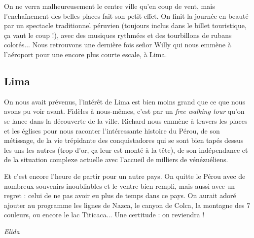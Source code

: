 On ne verra malheureusement le centre ville qu'en coup de vent, mais
l'enchaînement des belles places fait son petit effet. On finit la
journée en beauté par un spectacle traditionnel péruvien (toujours
inclus dans le billet touristique, ça vaut le coup !), avec des musiques
rythmées et des tourbillons de rubans colorés... Nous retrouvons une
dernière fois señor Willy qui nous emmène à l'aéroport pour une encore
plus courte escale, à Lima.

\hypertarget{lima}{%
\subsection{Lima}\label{lima}}

On nous avait prévenus, l'intérêt de Lima est bien moins grand que ce
que nous avons pu voir avant. Fidèles à nous-mêmes, c'est par un
\emph{free walking tour} qu'on se lance dans la découverte de la ville.
Richard nous emmène à travers les places et les églises pour nous
raconter l'intéressante histoire du Pérou, de son métissage, de la vie
trépidante des conquistadores qui se sont bien tapés dessus les uns les
autres (trop d'or, ça leur est monté à la tête), de son indépendance et
de la situation complexe actuelle avec l'accueil de milliers de
vénézuéliens.

Et c'est encore l'heure de partir pour un autre pays. On quitte le Pérou
avec de nombreux souvenirs inoubliables et le ventre bien rempli, mais
aussi avec un regret : celui de ne pas avoir eu plus de temps dans ce
pays. On aurait adoré ajouter au programme les lignes de Nazca, le
canyon de Colca, la montagne des 7 couleurs, ou encore le lac
Titicaca... Une certitude : on reviendra !

\emph{Elida}



